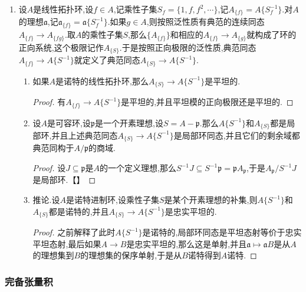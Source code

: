 \begin{enumerate}
\begin{enumerate}[(1)]
\begin{proof}
        	因为$A\{S_2^{-1}\}=A\{S_1^{-1}\}\{{S_2'}^{-1}\}$.
        \end{proof}
    \end{enumerate}
    \item 设$A$是线性拓扑环,设$f\in A$,记乘性子集$S_f=\{1,f,f^2,\cdots\}$,记$A_{\{f\}}=A\{S_f^{-1}\}$.对$A$的理想$\mathfrak{a}$,记$\mathfrak{a}_{\{f\}}=\mathfrak{a}\{S_f^{-1}\}$.如果$g\in A$,则按照泛性质有典范的连续同态$A_{\{f\}}\to A_{\{fg\}}$.取$A$的乘性子集$S$,那么$\{A_{\{f\}}\}$和相应的$A_{\{f\}}\to A_{\{g\}}$就构成了环的正向系统,这个极限记作$A_{\{S\}}$.于是按照正向极限的泛性质,典范同态$A_{\{f\}}\to A\{S^{-1}\}$就定义了典范同态$A_{\{S\}}\to A\{S^{-1}\}$.
    \begin{enumerate}[(1)]
    	\item 如果$A$是诺特的线性拓扑环,那么$A_{\{S\}}\to A\{S^{-1}\}$是平坦的.
    	\begin{proof}
    		
    		有$A_{\{f\}}\to A\{S^{-1}\}$是平坦的,并且平坦模的正向极限还是平坦的.
    	\end{proof}
        \item 设$A$是可容环,设$\mathfrak{p}$是一个开素理想,设$S=A-\mathfrak{p}$.那么$A\{S^{-1}\}$和$A_{\{S\}}$都是局部环,并且上述典范同态$A_{\{S\}}\to A\{S^{-1}\}$是局部环同态,并且它们的剩余域都典范同构于$A/\mathfrak{p}$的商域.
        \begin{proof}
        	
        	设$J\subseteq\mathfrak{p}$是$A$的一个定义理想,那么$S^{-1}J\subseteq S^{-1}\mathfrak{p}=\mathfrak{p}A_{\mathfrak{p}}$,于是$A_{\mathfrak{p}}/S^{-1}J$是局部环.【】
        	
        \end{proof}
        \item 推论.设$A$是诺特进制环,设乘性子集$S$是某个开素理想的补集,则$A\{S^{-1}\}$和$A_{\{S\}}$都是诺特的,并且$A_{\{S\}}\to A\{S^{-1}\}$是忠实平坦的.
        \begin{proof}
        	
        	之前解释了此时$A\{S^{-1}\}$是诺特的,局部环同态是平坦态射等价于忠实平坦态射,最后如果$A\to B$是忠实平坦的,那么这是单射,并且$\mathfrak{a}\mapsto\mathfrak{a}B$是从$A$的理想集到$B$的理想集的保序单射,于是从$B$诺特得到$A$诺特.
        \end{proof}
    \end{enumerate}
\end{enumerate}
\subsubsection{完备张量积}


